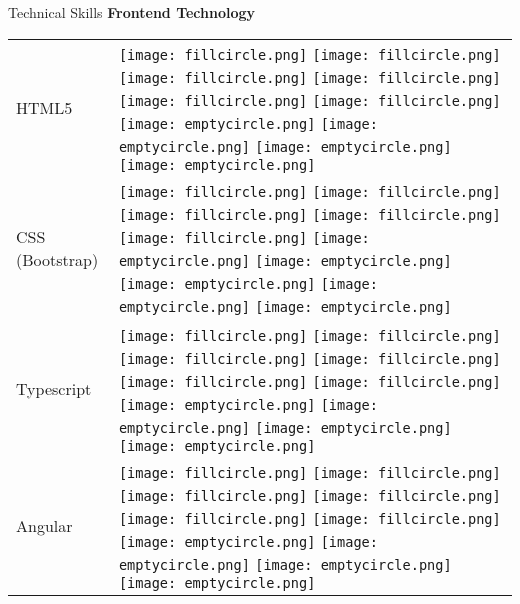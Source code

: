 \documentclass{resume}
\begin{document}
\begin{rSection}{Technical Skills}
{\bf Frontend Technology}
\begin{table}[h!]
  \begin{tabular}{p{10cm}p{6cm}}
 HTML5 & 
 \texttt{[image: fillcircle.png]} 
 \texttt{[image: fillcircle.png]} 
 \texttt{[image: fillcircle.png]}
 \texttt{[image: fillcircle.png]} 
 \texttt{[image: fillcircle.png]}
 \texttt{[image: fillcircle.png]} 
 \texttt{[image: emptycircle.png]}
 \texttt{[image: emptycircle.png]} 
 \texttt{[image: emptycircle.png]} 
 \texttt{[image: emptycircle.png]} \\
 CSS (Bootstrap) & 
 \texttt{[image: fillcircle.png]} 
 \texttt{[image: fillcircle.png]} 
 \texttt{[image: fillcircle.png]}
 \texttt{[image: fillcircle.png]} 
 \texttt{[image: fillcircle.png]}
 \texttt{[image: emptycircle.png]} 
 \texttt{[image: emptycircle.png]}
 \texttt{[image: emptycircle.png]} 
 \texttt{[image: emptycircle.png]} 
 \texttt{[image: emptycircle.png]} \\
 Typescript & 
 \texttt{[image: fillcircle.png]} 
 \texttt{[image: fillcircle.png]} 
 \texttt{[image: fillcircle.png]}
 \texttt{[image: fillcircle.png]} 
 \texttt{[image: fillcircle.png]}
 \texttt{[image: fillcircle.png]} 
 \texttt{[image: emptycircle.png]}
 \texttt{[image: emptycircle.png]} 
 \texttt{[image: emptycircle.png]} 
 \texttt{[image: emptycircle.png]} \\
 Angular & 
 \texttt{[image: fillcircle.png]} 
 \texttt{[image: fillcircle.png]} 
 \texttt{[image: fillcircle.png]}
 \texttt{[image: fillcircle.png]} 
 \texttt{[image: fillcircle.png]}
 \texttt{[image: fillcircle.png]} 
 \texttt{[image: emptycircle.png]}
 \texttt{[image: emptycircle.png]} 
 \texttt{[image: emptycircle.png]} 
 \texttt{[image: emptycircle.png]} \\
 \end{tabular}
\end{table}


\end{rSection}
\end{document}
